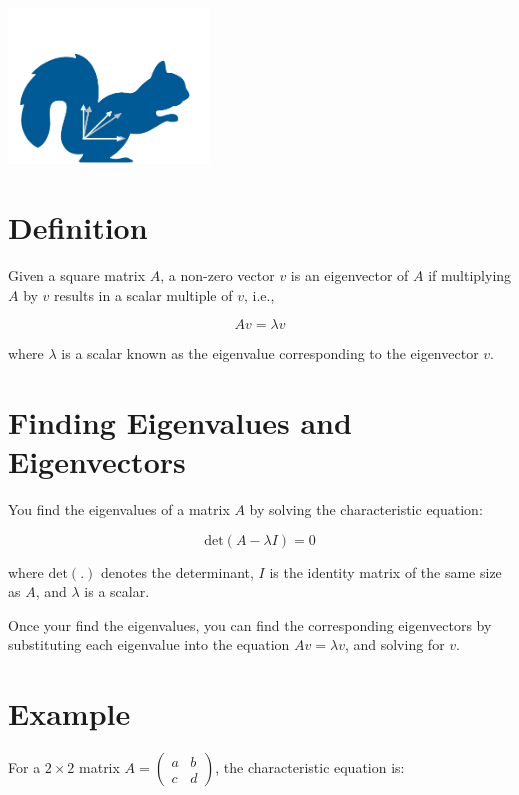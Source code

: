 \includegraphics[width=0.4\textwidth]{overlaysquirrel.png}


\section{Definition}

Given a square matrix $A$, a non-zero vector $v$ is an eigenvector of
$A$ if multiplying $A$ by $v$ results in a scalar multiple of $v$,
i.e.,

\begin{equation}
Av = \lambda v
\end{equation}

where $\lambda$ is a scalar known as the eigenvalue corresponding to the eigenvector $v$.

\section{Finding Eigenvalues and Eigenvectors}

You find the eigenvalues of a matrix $A$  by solving the characteristic equation:

\begin{equation}
\text{det}(A - \lambda I) = 0
\end{equation}

where $\text{det}(.)$ denotes the determinant, $I$ is the identity
matrix of the same size as $A$, and $\lambda$ is a scalar.

Once your find the eigenvalues, you can find the corresponding eigenvectors by substituting each eigenvalue into the equation $Av = \lambda
v$, and solving for $v$.

\section{Example}

For a $2 \times 2$ matrix $A = \begin{pmatrix} a & b \\ c &
  d \end{pmatrix}$, the characteristic equation is:

